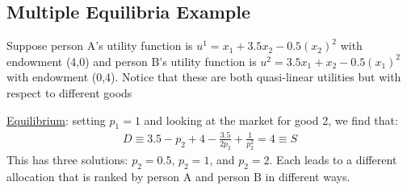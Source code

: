 \documentclass{article}
\begin{document}
\subsection{Multiple Equilibria Example}
Suppose person A's utility function is $u^{1} = x_{1} + 3.5x_{2} - 0.5(x_{2})^{2}$ with endowment (4,0) and person B's utility function is $u^{2} = 3.5x_{1} + x_{2} - 0.5(x_{1})^{2}$ with endowment (0,4). Notice that these are both quasi-linear utilities but with respect to different goods
\par \vspace{0.3em}
  \underline{Equilibrium}: setting $p_{1} = 1$ and looking at the market for good 2, we find that:
  \begin{gather*}
    D \equiv 3.5 - p_{2} + 4 - \frac{3.5}{2p_{2}} + \frac{1}{p_{2}^{2}} = 4 \equiv S
  \end{gather*}
  This has three solutions: $p_{2} = 0.5$, $p_{2} = 1$, and $p_{2} = 2$. Each leads to a different allocation that is ranked by person A and person B in different ways.
\par
\vspace{6mm}
\end{document}
